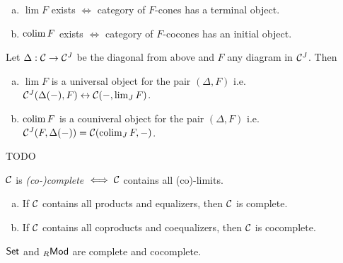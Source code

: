 \documentclass[a4paper]{report}
\begin{document}
\begin{exer}
          \begin{enumerate}[(a)]
\item $\lim F$ exists $\iff$ category of $F$-cones has a terminal object.
\item $\operatorname*{colim} F$ exists $\iff$ category of $F$-cocones has an initial object.
          \end{enumerate}
        \end{exer}
\begin{prop}[Exercise]
  Let $\Delta : \mathcal{C} \to \mathcal{C}^{J}$ be the diagonal from above and $F$ any diagram in $\mathcal{C}^{J}$. Then
  \begin{enumerate}[(a)]
    \item $\lim F$ is a universal object for the pair $(\Delta, F)$ i.e. $\mathcal{C}^{J}(\Delta(-), F) \leftrightarrow \mathcal{C}(-, \lim_{J} F)$.
          \item $\operatorname*{colim} F$ is a couniveral object for the pair $(\Delta, F)$ i.e. $\mathcal{C}^{J}(F, \Delta(-)) = \mathcal{C}(\operatorname*{colim}_{J} F, -)$.
  \end{enumerate}

\end{prop}
        \begin{exmps}
TODO
        \end{exmps}
   \begin{defi}
$\mathcal{C}$ is \emph{(co-)complete} $\iff \mathcal{C}$ contains all (co)-limits.
\end{defi}
\begin{thm}
  \begin{enumerate}[(a)]
\item If $\mathcal{C}$ contains all products and equalizers, then $\mathcal{C}$ is complete.
\item If $\mathcal{C}$ contains all coproducts and coequalizers, then $\mathcal{C}$ is cocomplete.
  \end{enumerate}

\end{thm}
\begin{cor}
$\mathsf{Set}$ and ${}_R\mathsf{Mod}$ are complete and cocomplete.
\end{cor}
\end{document}
